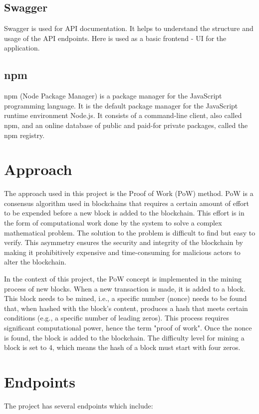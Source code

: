\documentclass{article}
\begin{document}
\subsection{Swagger}
Swagger is used for API documentation. It helps to understand the structure and usage of the API endpoints. Here is used as a basic frontend - UI for the application.

\subsection{npm}
npm (Node Package Manager) is a package manager for the JavaScript programming language. It is the default package manager for the JavaScript runtime environment Node.js. It consists of a command-line client, also called npm, and an online database of public and paid-for private packages, called the npm registry.


\section{Approach}
The approach used in this project is the Proof of Work (PoW) method. PoW is a consensus algorithm used in blockchains that requires a certain amount of effort to be expended before a new block is added to the blockchain. This effort is in the form of computational work done by the system to solve a complex mathematical problem. The solution to the problem is difficult to find but easy to verify. This asymmetry ensures the security and integrity of the blockchain by making it prohibitively expensive and time-consuming for malicious actors to alter the blockchain.

In the context of this project, the PoW concept is implemented in the mining process of new blocks. When a new transaction is made, it is added to a block. This block needs to be mined, i.e., a specific number (nonce) needs to be found that, when hashed with the block's content, produces a hash that meets certain conditions (e.g., a specific number of leading zeros). This process requires significant computational power, hence the term "proof of work". Once the nonce is found, the block is added to the blockchain. The difficulty level for mining a block is set to 4, which means the hash of a block must start with four zeros.

\section{Endpoints}
The project has several endpoints which include:
\end{document}

